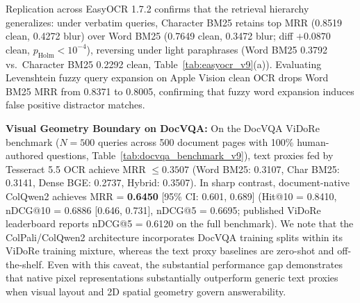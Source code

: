 Replication across EasyOCR 1.7.2 \cite{jaidedai2020easyocr} confirms that the retrieval hierarchy generalizes: under verbatim queries, Character BM25 retains top MRR (0.8519 clean, 0.4272 blur) over Word BM25 (0.7649 clean, 0.3472 blur; diff $+0.0870$ clean, $p_{\text{Holm}} < 10^{-4}$), reversing under light paraphrases (Word BM25 0.3792 vs.\ Character BM25 0.2292 clean, Table~\ref{tab:easyocr_v9}(a)). Evaluating Levenshtein fuzzy query expansion on Apple Vision clean OCR drops Word BM25 MRR from 0.8371 to 0.8005, confirming that fuzzy word expansion induces false positive distractor matches.

\textbf{Visual Geometry Boundary on DocVQA:} On the DocVQA ViDoRe benchmark ($N=500$ queries across 500 document pages with 100\% human-authored questions, Table~\ref{tab:docvqa_benchmark_v9}), text proxies fed by Tesseract 5.5 OCR achieve MRR $\le 0.3507$ (Word BM25: 0.3107, Char BM25: 0.3141, Dense BGE: 0.2737, Hybrid: 0.3507). In sharp contrast, document-native ColQwen2 \cite{faysse2024colqwen2} achieves MRR = \textbf{0.6450} [95\% CI: 0.601, 0.689] (Hit@10 = 0.8410, nDCG@10 = 0.6886 [0.646, 0.731], nDCG@5 = 0.6695; published ViDoRe leaderboard reports nDCG@5 = 0.6120 on the full benchmark). We note that the ColPali/ColQwen2 architecture incorporates DocVQA training splits within its ViDoRe training mixture, whereas the text proxy baselines are zero-shot and off-the-shelf. Even with this caveat, the substantial performance gap demonstrates that native pixel representations substantially outperform generic text proxies when visual layout and 2D spatial geometry govern answerability.

